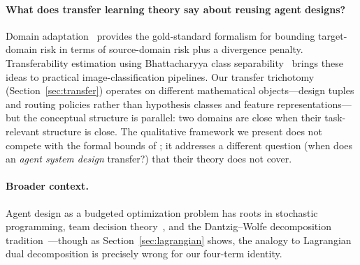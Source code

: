 \paragraph{What does transfer learning theory say about reusing agent designs?}
Domain adaptation~\citep{bendavid2010theory} provides the gold-standard formalism for bounding target-domain risk in terms of source-domain risk plus a divergence penalty.
Transferability estimation using Bhattacharyya class separability~\citep{pandy2022gbc} brings these ideas to practical image-classification pipelines.
Our transfer trichotomy (Section~\ref{sec:transfer}) operates on different mathematical objects---design tuples and routing policies rather than hypothesis classes and feature representations---but the conceptual structure is parallel: two domains are close when their task-relevant structure is close.
The qualitative framework we present does not compete with the formal bounds of \citet{bendavid2010theory}; it addresses a different question (when does an \emph{agent system design} transfer?) that their theory does not cover.

\paragraph{Broader context.}
Agent design as a budgeted optimization problem has roots in stochastic programming, team decision theory~\citep{multiagentfinance2026}, and the Dantzig--Wolfe decomposition tradition~\citep{dantzigwolfe1960,fisher2004lagrangian}---though as Section~\ref{sec:lagrangian} shows, the analogy to Lagrangian dual decomposition is precisely wrong for our four-term identity.
